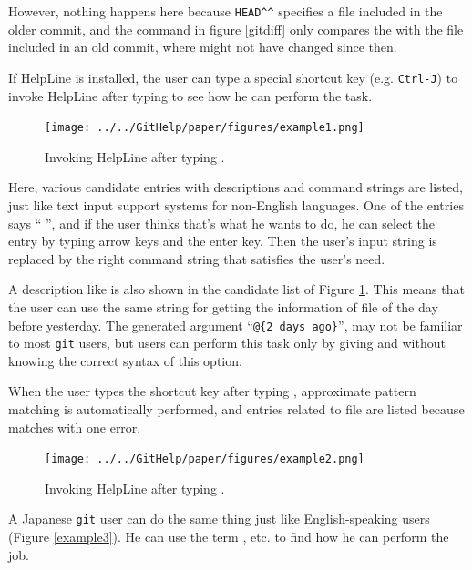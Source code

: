 \documentclass[manuscript,screen,review]{acmart}
\def\HL{\textsf{HelpLine}}
\def\GIT{\texttt{git}}
\begin{document}
However, nothing happens here because
\verb|HEAD^^|
specifies a file included in the older commit,
and the command in figure \ref{gitdiff} only compares the
 with the file included in an old commit, where
 might not have changed since then.

If {\HL} is installed,
the user can type a special shortcut key
(e.g. \texttt{Ctrl-J})
to invoke {\HL} after typing  to see how he can
perform the task.

\begin{figure}[h]
  \texttt{[image: ../../GitHelp/paper/figures/example1.png]}
  \caption{Invoking {\HL} after typing .}
  \label{example1}
\end{figure}

Here, various candidate entries with descriptions and command strings are listed,
just like text input support systems for non-English languages.
One of the entries says
``  '',
and if the user thinks that's what he wants to do,
he can select the entry by typing arrow keys and the enter key.
Then the user's input string is replaced by the right command string
that satisfies the user's need.

A description like  is also shown in the candidate list
of Figure \ref{example1}.
This means that the user can use the same string 
for getting the information of  file of the day before yesterday.
The generated argument
``{\smallfont\verb|@{2 days ago}|}'',
may not be familiar to most {\GIT} users,
but users can perform this task only by giving  and 
without knowing the correct syntax of this option.

When the user types the shortcut key
after typing ,
approximate pattern matching is automatically performed, and
entries related to  file are listed because
 matches  with one error.

\begin{figure}[h]
  \texttt{[image: ../../GitHelp/paper/figures/example2.png]}
  \caption{Invoking {\HL} after typing .}
  \label{example2}
\end{figure}

A Japanese {\GIT} user can do the same thing just like
English-speaking users (Figure \ref{example3}).
He can use the term , etc. to find how he can perform the job.
\end{document}
